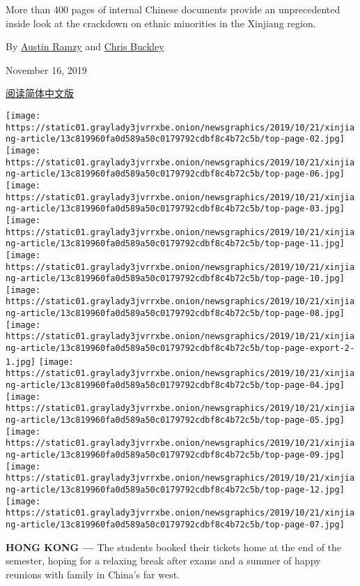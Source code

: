More than 400 pages of internal Chinese documents provide an
unprecedented inside look at the crackdown on ethnic minorities in the
Xinjiang region.

By \href{https://www.nytimes3xbfgragh.onion/by/austin-ramzy}{Austin
Ramzy} and
\href{https://www.nytimes3xbfgragh.onion/by/chris-buckley}{Chris
Buckley}

November 16, 2019

\href{https://www.nytimes3xbfgragh.onion/zh/2019/11/16/world/asia/xinjiang-documents-chinese.html}{阅读简体中文版}

\texttt{[image: https://static01.graylady3jvrrxbe.onion/newsgraphics/2019/10/21/xinjiang-article/13c819960fa0d589a50c0179792cdbf8c4b72c5b/top-page-02.jpg]}
\texttt{[image: https://static01.graylady3jvrrxbe.onion/newsgraphics/2019/10/21/xinjiang-article/13c819960fa0d589a50c0179792cdbf8c4b72c5b/top-page-06.jpg]}
\texttt{[image: https://static01.graylady3jvrrxbe.onion/newsgraphics/2019/10/21/xinjiang-article/13c819960fa0d589a50c0179792cdbf8c4b72c5b/top-page-03.jpg]}
\texttt{[image: https://static01.graylady3jvrrxbe.onion/newsgraphics/2019/10/21/xinjiang-article/13c819960fa0d589a50c0179792cdbf8c4b72c5b/top-page-11.jpg]}
\texttt{[image: https://static01.graylady3jvrrxbe.onion/newsgraphics/2019/10/21/xinjiang-article/13c819960fa0d589a50c0179792cdbf8c4b72c5b/top-page-10.jpg]}
\texttt{[image: https://static01.graylady3jvrrxbe.onion/newsgraphics/2019/10/21/xinjiang-article/13c819960fa0d589a50c0179792cdbf8c4b72c5b/top-page-08.jpg]}
\texttt{[image: https://static01.graylady3jvrrxbe.onion/newsgraphics/2019/10/21/xinjiang-article/13c819960fa0d589a50c0179792cdbf8c4b72c5b/top-page-export-2-1.jpg]}
\texttt{[image: https://static01.graylady3jvrrxbe.onion/newsgraphics/2019/10/21/xinjiang-article/13c819960fa0d589a50c0179792cdbf8c4b72c5b/top-page-04.jpg]}
\texttt{[image: https://static01.graylady3jvrrxbe.onion/newsgraphics/2019/10/21/xinjiang-article/13c819960fa0d589a50c0179792cdbf8c4b72c5b/top-page-05.jpg]}
\texttt{[image: https://static01.graylady3jvrrxbe.onion/newsgraphics/2019/10/21/xinjiang-article/13c819960fa0d589a50c0179792cdbf8c4b72c5b/top-page-09.jpg]}
\texttt{[image: https://static01.graylady3jvrrxbe.onion/newsgraphics/2019/10/21/xinjiang-article/13c819960fa0d589a50c0179792cdbf8c4b72c5b/top-page-12.jpg]}
\texttt{[image: https://static01.graylady3jvrrxbe.onion/newsgraphics/2019/10/21/xinjiang-article/13c819960fa0d589a50c0179792cdbf8c4b72c5b/top-page-07.jpg]}

\textbf{HONG KONG ---} The students booked their tickets home at the end
of the semester, hoping for a relaxing break after exams and a summer of
happy reunions with family in China's far west.

